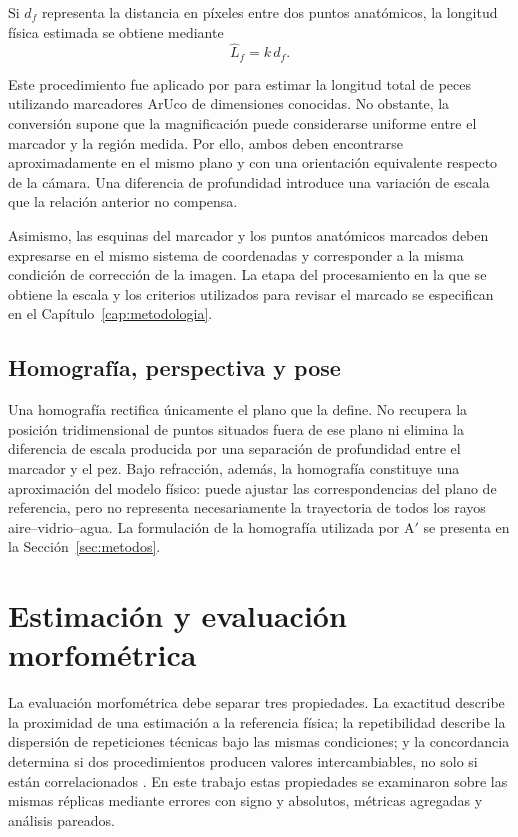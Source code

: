 \documentclass{report}
\newcommand{\Aprime}{A$'$}
\begin{document}
Si $d_f$ representa la distancia en píxeles entre dos puntos anatómicos, la longitud física estimada se obtiene mediante
\begin{equation}
\hat{L}_f = k\,d_f .
\label{eq:Lf}
\end{equation}

Este procedimiento fue aplicado por \textcite{Monkman2019} para estimar la longitud total de peces utilizando marcadores ArUco de dimensiones conocidas. No obstante, la conversión supone que la magnificación puede considerarse uniforme entre el marcador y la región medida. Por ello, ambos deben encontrarse aproximadamente en el mismo plano y con una orientación equivalente respecto de la cámara. Una diferencia de profundidad introduce una variación de escala que la relación anterior no compensa.

Asimismo, las esquinas del marcador y los puntos anatómicos marcados deben expresarse en el mismo sistema de coordenadas y corresponder a la misma condición de corrección de la imagen. La etapa del procesamiento en la que se obtiene la escala y los criterios utilizados para revisar el marcado se especifican en el Capítulo~\ref{cap:metodologia}.

\subsection{Homografía, perspectiva y pose}

Una homografía rectifica únicamente el plano que la define. No recupera la posición tridimensional de puntos situados fuera de ese plano ni elimina la diferencia de escala producida por una separación de profundidad entre el marcador y el pez. Bajo refracción, además, la homografía constituye una aproximación del modelo físico: puede ajustar las correspondencias del plano de referencia, pero no representa necesariamente la trayectoria de todos los rayos aire--vidrio--agua. La formulación de la homografía utilizada por \Aprime{} se presenta en la Sección~\ref{sec:metodos}.

\section{Estimación y evaluación morfométrica}

La evaluación morfométrica debe separar tres propiedades. La exactitud describe la proximidad de una estimación a la referencia física; la repetibilidad describe la dispersión de repeticiones técnicas bajo las mismas condiciones; y la concordancia determina si dos procedimientos producen valores intercambiables, no solo si están correlacionados \parencite{Bland1986,Lin1989}. En este trabajo estas propiedades se examinaron sobre las mismas réplicas mediante errores con signo y absolutos, métricas agregadas y análisis pareados.
\end{document}
